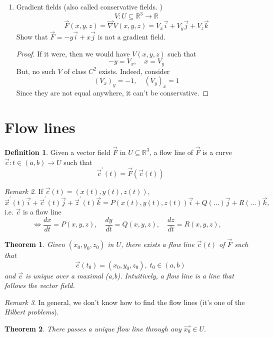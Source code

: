 \documentclass[12pt]{book}
\newtheorem{theorem}{Theorem}[section]
\theoremstyle{definition}
\newtheorem{definition}{Definition}[section]
\theoremstyle{remark}
\newtheorem*{remark}{Remark}
\begin{document}
\begin{example}
\begin{enumerate}
\begin{remark} 
  Any planar vector field can be thought of as spatial: 
  $$\vec{{F}} (x,y,z) = P( x,y) \vec{{i}} + Q(x,y) \vec{{j}} $$
\end{remark}
  \item Gradient fields (also called conservative fields. )
$$V : U \subseteq \mathbb{R}^3 \to \mathbb{R} $$
  $$\vec{{F}} {(x,y,z)} = \vec{{\nabla}} V(x,y,z) =V_x \vec{{i}} + V_y \vec{{j}} + V_z \vec{{k}}   $$
  Show that $\vec{{F}} = -y \vec{{i}} + x \vec{j}$ is not a gradient field. 
  \begin{proof} 
    If it were, then we would have 
    $V(x,y,z) $ such that 
    $$-y = V_x , \quad x= V_y$$
    But, no such $V$ of class $C^2$ exists. Indeed, consider 
    $$(V_x)_y = -1, \quad (V_y)_x = 1 $$
    Since they are not equal anywhere, it can't be conservative.
  \end{proof}
\end{enumerate}
\end{example}
\section{Flow lines}%
  \label{sub:Name}
  \begin{definition}Given a vector field $\vec{{F}}$ in $U\subseteq \mathbb{R}^3$, a flow line of $\vec{{F}} $ is a curve $\vec{{c}} : t\in (a,b) \to U$ such that $$\vec{{c}}^\prime {(t)}= \vec{{F}} (\vec{{c}} {(t)}) $$ 
    \begin{remark} 
      If $\vec{{c}} {(t)} = ( x (t), y(t), z(t))$, 
      $$\vec{{x}}^\prime (t) \vec{{i}} + \vec{{c}}^\prime (t)\vec{{j}} + \vec{{z}}^\prime (t) \vec{{k}} = P(x(t), y(t), z(t))\vec{{i}} + Q(...)\vec{{j}} + R(...)\vec{{k}} {}, $$
      i.e. $\vec{{c}} {}$ is a flow line 
      $$\iff \frac{d {x}}{d {t}} = P(x,y,z), \quad \frac{d {y}}{d {t}} = Q(x,y,z), \quad \frac{d {z}}{d {t}} = R(x,y,z), \quad  $$
    \end{remark}
  \end{definition}
  \begin{theorem} \label{label}
    Given $(x_0, y_0, z_0)$ in $U$, there exists a flow line $\vec{{c}} {(t)}$ of $\vec{{F}} $ such that $$\vec{{c}}(t_0) = (x_0, y_0, z_0), \; t_0 \in (a,b) $$
    and $\vec{{c}} $ is unique over a maximal (a,b). Intuitively, a flow line is a line that follows the vector field. 
  \end{theorem}
  \begin{remark} 
    In general, we don't know how to find the flow lines (it's one of the \textit{Hilbert problems}).
  \end{remark}
\begin{theorem}
  There passes a unique flow line through any $\vec{{x_0}} \in U.$
\end{theorem}
\end{document}

